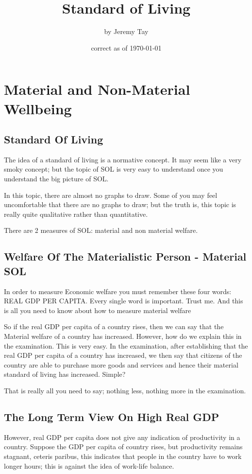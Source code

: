 \RequirePackage{../../dominatrix}

\title{Standard of Living}
\author{\large by Jeremy Tay}
\date{\small correct as of \today}

\maketitle
\tableofcontents
\section{Material and Non-Material Wellbeing}
\subsection{Standard Of Living}
The idea of a standard of living is a normative concept. It may seem like a very smoky concept; but the topic of SOL is very easy to understand once you understand the big picture of SOL.

In this topic, there are almost no graphs to draw. Some of you may feel uncomfortable that there are no graphs to draw; but the truth is, this topic is really quite qualitative rather than quantitative.

There are 2 measures of SOL: material and non material welfare.
\subsection{Welfare Of The Materialistic Person - Material SOL}
In order to measure Economic welfare you must remember these four words: REAL GDP PER CAPITA. Every single word is important. Trust me. And this is all you need to know about how to measure material welfare

So if the real GDP per capita of a country rises, then we can say that the Material welfare of a country has increased. However, how do we explain this in the examination. This is very easy. In the examination, after establishing that the real GDP per capita of a country has increased, we then say that citizens of the country are able to purchase more goods and services and hence their material standard of living has increased. Simple? 
 
That is really all you need to say; nothing less, nothing more in the examination.
\subsection{The Long Term View On High Real GDP}
However, real GDP per capita does not give any indication of productivity in a country. Suppose the GDP per capita of country rises, but productivity remains stagnant, ceteris paribus, this indicates that people in the country have to work longer hours; this is against the idea of work-life balance.


